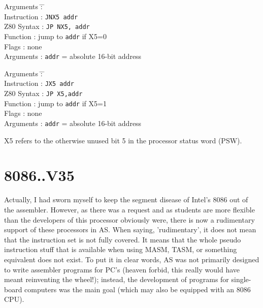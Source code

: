 \documentclass[12pt,twoside]{report}
\newcommand{\tty}[1]{{\tt #1}}
\newcommand{\asname}{{AS}}
\begin{document}
\begin{tabbing}
Arguments         \= : \= \kill \\
Instruction       \> : \> \tty{JNX5 addr} \\
Z80 Syntax        \> : \> \tty{JP NX5, addr} \\
Function          \> : \> jump to {\tt addr} if X5=0 \\
Flags             \> : \> none \\
Arguments         \> : \> {\tt addr} = absolute 16-bit address \\
\end{tabbing}

\begin{tabbing}
Arguments         \= : \= \kill \\
Instruction       \> : \> \tty{JX5 addr} \\
Z80 Syntax        \> : \> \tty{JP X5,addr} \\
Function          \> : \> jump to {\tt addr} if X5=1 \\
Flags             \> : \> none \\
Arguments         \> : \> {\tt addr} = absolute 16-bit address \\
\end{tabbing}

X5 refers to the otherwise unused bit 5 in the processor status word (PSW).


\section{8086..V35}

Actually, I had sworn myself to keep the segment disease of Intel's
8086 out of the assembler.  However, as there was a request and as
students are more flexible than the developers of this processor
obviously were, there is now a rudimentary support of these
processors in \asname{}.  When saying, 'rudimentary', it does not mean that
the instruction set is not fully covered.  It means that the whole
pseudo instruction stuff that is available when using MASM, TASM, or
something equivalent does not exist.  To put it in clear words, \asname{}
was not primarily designed to write assembler programs for PC's
(heaven forbid, this really would have meant reinventing the wheel!);
instead, the development of programs for single-board computers was
the main goal (which may also be equipped with an 8086 CPU).
\end{document}
